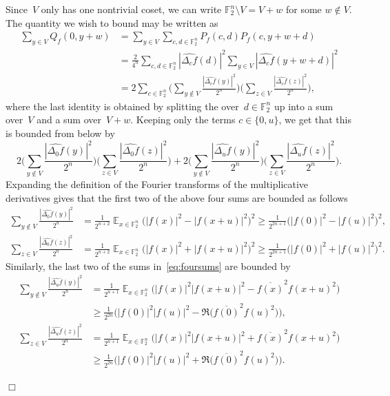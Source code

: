\documentclass[11pt]{amsart}
\newcommand{\Exp}{\mathop{\mathbb{E}}}
\newcommand{\F}{\mathbb{F}} %
\theoremstyle{plain}
\theoremstyle{definition}
\theoremstyle{remark}
\renewenvironment{proof}[1][]{
    	\begin{trivlist}
     	\item[\hspace{\labelsep}{\em\noindent Proof#1:\/}]}
     	{{\hfill$\Box$}
    	\end{trivlist}
  }
\begin{document}
\begin{proof}
Since~$V$ only has one nontrivial coset, we can write $\F_2^n\setminus V = V+w$ for some $w\not\in V$.
The quantity we wish to bound may be written as
 \begin{align*}
      \sum_{y\in V}Q_f(0,y+w) 
      &= \sum_{y \in V}\sum_{c,d\in \F_2^n}P_f(c,d)P_f(c,y+w+d)\\
      &=\frac{2}{4^n}\sum_{c,d\in \F_2^n}|\widehat{\Delta_cf}(d)|^2\sum_{y \in V}|\widehat{\Delta_cf}(y+w+d)|^2\\
      &=2\sum_{c\in \F_2^n}\Big(\sum_{y\not\in V}\frac{|\widehat{\Delta_cf}(y)|^2}{2^n}\Big)
      \Big(\sum_{z\in V}\frac{|\widehat{\Delta_cf}(z)|^2}{2^n}\Big),
  \end{align*}
  where the last identity is obtained by splitting the over~$d\in \F_2^n$ up into a sum over~$V$ and a sum over~$V+w$.
  Keeping only the terms $c\in \{0,u\}$, we get that this is bounded from below by
  \begin{equation}\label{eq:foursums}
      2\Big(\sum_{y\not\in V}\frac{|\widehat{\Delta_0f}(y)|^2}{2^n}\Big)
      \Big(\sum_{z\in V}\frac{|\widehat{\Delta_0f}(z)|^2}{2^n}\Big)
      +
      2\Big(\sum_{y\not\in V}\frac{|\widehat{\Delta_uf}(y)|^2}{2^n}\Big)
      \Big(\sum_{z\in V}\frac{|\widehat{\Delta_uf}(z)|^2}{2^n}\Big).
  \end{equation}
  Expanding the definition of the Fourier transforms of the multiplicative derivatives gives that the first two of the above four sums  are bounded as follows
  \begin{align*}
     \sum_{y\not\in V}\frac{|\widehat{\Delta_0f}(y)|^2}{2^n}
     &=
     \frac{1}{2^{n+2}}\Exp_{x\in \F_2^n}\big(|f(x)|^2 - |f(x+u)|^2\big)^2\geq \frac{1}{2^{2n+1}}\big(|f(0)|^2 - |f(u)|^2\big)^2, \\
     \sum_{z\in V}\frac{|\widehat{\Delta_0f}(z)|^2}{2^n}
     &=
     \frac{1}{2^{n+2}}\Exp_{x\in \F_2^n}\big(|f(x)|^2 + |f(x+u)|^2\big)^2\geq \frac{1}{2^{2n+1}}\big(|f(0)|^2 + |f(u)|^2\big)^2.
  \end{align*}
Similarly, the last two of the sums in~\eqref{eq:foursums} are bounded by
    \begin{align*}
     \sum_{y\not\in V}\frac{|\widehat{\Delta_uf}(y)|^2}{2^n}
     &=
     \frac{1}{2^{n+1}}\Exp_{x\in \F_2^n}\big(|f(x)|^2|f(x+u)|^2 - \overline{f(x)}^2f(x+u)^2\big)\\
     &\geq \frac{1}{2^{2n}}\big(|f(0)|^2|f(u)|^2 - \Re\big(\overline{f(0)}^2f(u)^2\big)\big), \\
     \sum_{z\in V}\frac{|\widehat{\Delta_uf}(z)|^2}{2^n}
     &=
     \frac{1}{2^{n+1}}\Exp_{x\in \F_2^n}\big(|f(x)|^2|f(x+u)|^2 + \overline{f(x)}^2f(x+u)^2\big)\\
     &\geq \frac{1}{2^{2n}}\big(|f(0)|^2|f(u)|^2 + \Re\big(\overline{f(0)}^2f(u)^2\big)\big).
  \end{align*}


\end{proof}
\end{document}
